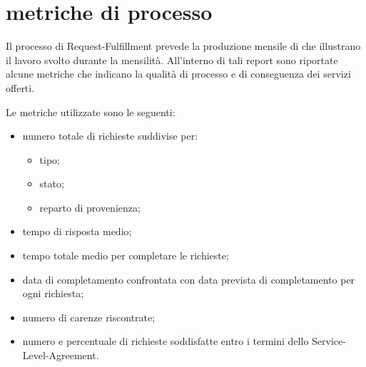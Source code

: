%
%
\section[Metriche di processo]{metriche di processo}
\label{rf-metrics}
Il processo di \ac{Request-Fulfillment} prevede la produzione mensile di  che illustrano il lavoro svolto durante la mensilità. All'interno di tali report sono riportate alcune metriche che indicano la qualità di processo e di conseguenza dei servizi offerti.

Le metriche utilizzate sono le seguenti:

\begin{itemize}
\item{numero totale di richieste suddivise per:}
\begin{itemize}
\item{tipo;}
\item{stato;}
\item{reparto di provenienza;}
\end{itemize}
\item{tempo di risposta medio;}
\item{tempo totale medio per completare le richieste;}
\item{data di completamento confrontata con data prevista di completamento per ogni richiesta;}
\item{numero di carenze riscontrate;}
\item{numero e percentuale di richieste soddisfatte entro i termini dello \ac{Service-Level-Agreement}.}
\end{itemize}
